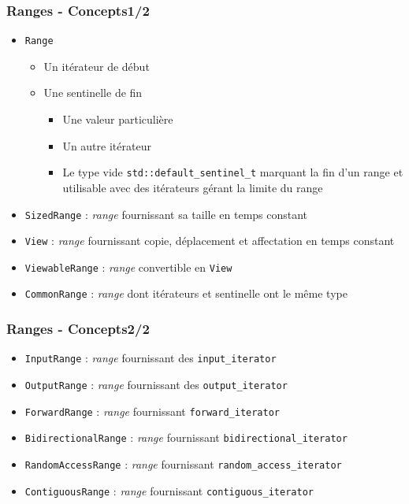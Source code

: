 \documentclass[C++.tex]{subfiles}
\begin{document}
\begin{frame}[fragile]
	\frametitle{Ranges - Concepts\titlehfill{}1/2}
	\begin{itemize}
		\item \lstinline|Range|
		\begin{itemize}
			\item Un itérateur de début
			\item Une sentinelle de fin
			\begin{itemize}
				\item Une valeur particulière
				\item Un autre itérateur


				\item Le type vide \lstinline|std::default_sentinel_t| marquant la fin d'un range et utilisable avec des itérateurs gérant la limite du range

			\end{itemize}
		\end{itemize}

		\item \lstinline|SizedRange| : \textit{range} fournissant sa taille en temps constant
		\item \lstinline|View| : \textit{range} fournissant copie, déplacement et affectation en temps constant
		\item \lstinline|ViewableRange| : \textit{range} convertible en \lstinline|View|
		\item \lstinline|CommonRange| : \textit{range} dont itérateurs et sentinelle ont le même type
	\end{itemize}
\end{frame}

\begin{frame}[fragile]
	\frametitle{Ranges - Concepts\titlehfill{}2/2}
	\begin{itemize}
		\item \lstinline|InputRange| : \textit{range} fournissant des \lstinline|input_iterator|
		\item \lstinline|OutputRange| : \textit{range} fournissant des \lstinline|output_iterator|
		\item \lstinline|ForwardRange| : \textit{range} fournissant \lstinline|forward_iterator|
		\item \lstinline|BidirectionalRange| : \textit{range} fournissant \lstinline|bidirectional_iterator|
		\item \lstinline|RandomAccessRange| : \textit{range} fournissant \lstinline|random_access_iterator|
		\item \lstinline|ContiguousRange| : \textit{range} fournissant \lstinline|contiguous_iterator|
	\end{itemize}
\end{frame}
\end{document}
